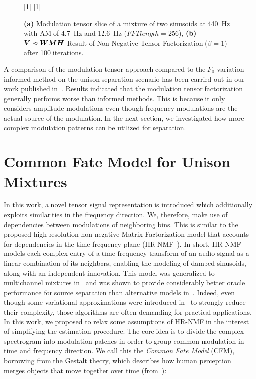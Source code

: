 \begin{figure}[!h]
\centering
{}
[1\textwidth]{}%
\hspace{0.3\textwidth} %
[1\textwidth]{}%
\caption{\textbf{(a)} Modulation tensor slice of a mixture of two sinusoids at \SI{440}{\hertz} with AM of \SI{4.7}{\hertz} and \SI{12.6}{\hertz} ($FFT length = 256$), \textbf{(b)}  ${\bm{V}} \approx {\bm{W}} {\bm{M}} {\bm{H}}$ Result of Non-Negative Tensor Factorization ($\beta = 1$) after 100 iterations.}
\label{fig:am_ntf}
\end{figure}
\par
A comparison of the modulation tensor approach compared to the \(F_0\) variation informed method on the unison separation scenario has been carried out in our work published in~\cite{stoeter14}.
Results indicated that the modulation tensor factorization generally performs worse than informed methods.
This is because it only considers amplitude modulations even though frequency modulations are the actual source of the modulation.
In the next section, we investigated how more complex modulation patterns can be utilized for separation.

\section{Common Fate Model for Unison Mixtures}%
\label{sec:the_common_fate_model_for_unison_mixtures}


In this work, a novel tensor signal representation is introduced which additionally exploits similarities in the frequency direction.
We, therefore, make use of dependencies between modulations of neighboring bins.
This is similar to the proposed high-resolution non-negative Matrix Factorization model that accounts for dependencies in the time-frequency plane (HR-NMF~\cite{badeau11}).
In short, HR-NMF models each complex entry of a time-frequency transform of an audio signal as a linear combination of its neighbors, enabling the modeling of damped sinusoids, along with an independent innovation.
This model was generalized to multichannel mixtures in~\cite{badeau13a, badeau14} and was shown to provide considerably better oracle performance for source separation than alternative models in~\cite{magron15a}.
Indeed, even though some variational approximations were introduced in~\cite{badeau13} to strongly reduce their complexity, those algorithms are often demanding for practical applications.
In this work, we proposed to relax some assumptions of HR-NMF in the interest of simplifying the estimation procedure.
The core idea is to divide the complex spectrogram into modulation patches in order to group common modulation in time and frequency direction.
We call this the \emph{Common Fate Model} (CFM), borrowing from the Gestalt theory, which describes how human perception merges objects that move together over time (from~\cite{bregman90}):

